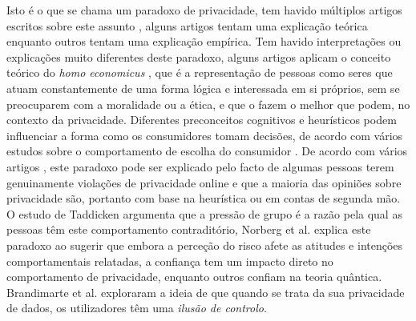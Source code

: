 \documentclass[conference]{IEEEtran}
\begin{document}

Isto é o que se chama um paradoxo de privacidade, tem havido múltiplos artigos
escritos sobre este assunto \cite{solove2021myth, WilliamsPrivacy, lee2021investigating, goad2021privacy, gerber2018explaining},
alguns artigos tentam uma explicação teórica enquanto outros tentam uma explicação
empírica. Tem havido interpretações ou explicações muito diferentes deste
paradoxo, alguns artigos \cite{wilson2012unpacking, warshaw2015can, lee2015privacy}
aplicam o conceito teórico do \textit{homo economicus} \cite{zak2008moral},
que é a representação de pessoas como seres que atuam constantemente de uma
forma lógica e interessada em si próprios, sem se preocuparem com a moralidade
ou a ética, e que o fazem o melhor que podem, no contexto da privacidade.
Diferentes preconceitos cognitivos e heurísticos podem influenciar a forma
como os consumidores tomam decisões, de acordo com vários estudos sobre o
comportamento de escolha do consumidor \cite{acquisti2007can, knijnenburg2013dimensionality, wakefield2013influence, flender2012type}.
De acordo com vários artigos \cite{dienlin2015privacy, baek2014solving}, este
paradoxo pode ser explicado pelo facto de algumas pessoas terem genuinamente
violações de privacidade online e que a maioria das opiniões sobre privacidade
são, portanto com base na heurística ou em contas de segunda mão. O estudo
de Taddicken \cite{taddicken2014privacy} argumenta que a pressão de grupo
é a razão pela qual as pessoas têm este comportamento contraditório, Norberg
et al. \cite{norberg2007privacy} explica este paradoxo ao sugerir que embora
a perceção do risco afete as atitudes e intenções comportamentais relatadas,
a confiança tem um impacto direto no comportamento de privacidade, enquanto
outros \cite{flender2012type, kokolakis2017privacy} confiam na teoria quântica.
Brandimarte et al. \cite{brandimarte2013misplaced} exploraram a ideia de que
quando se trata da sua privacidade de dados, os utilizadores têm uma \textit{ilusão
de controlo}.
\end{document}

